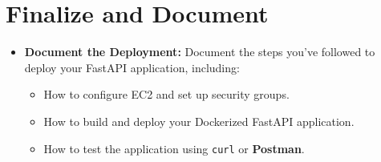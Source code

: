 \documentclass{article}
\begin{document}
\section{Finalize and Document}
\begin{itemize}
    \item \textbf{Document the Deployment:} Document the steps you've followed to deploy your FastAPI application, including:
    \begin{itemize}
        \item How to configure EC2 and set up security groups.
        \item How to build and deploy your Dockerized FastAPI application.
        \item How to test the application using \texttt{curl} or \textbf{Postman}.
    \end{itemize}
\end{itemize}
\end{document}
